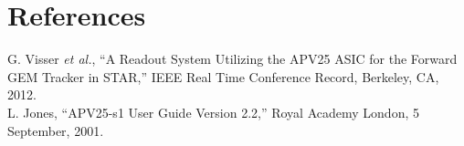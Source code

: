 \documentclass[preprint,12pt]{elsarticle}
\begin{document}
\section{References}
\begin{thebibliography}{999}
G. Visser {\it et al.}, ``A Readout System Utilizing the APV25 ASIC for the
Forward GEM Tracker in STAR,'' IEEE Real Time Conference Record, Berkeley, CA,
2012. \\
L. Jones, ``APV25-s1 User Guide Version 2.2,'' Royal Academy London, 5
September, 2001. \\
\end{thebibliography}
\end{document}
